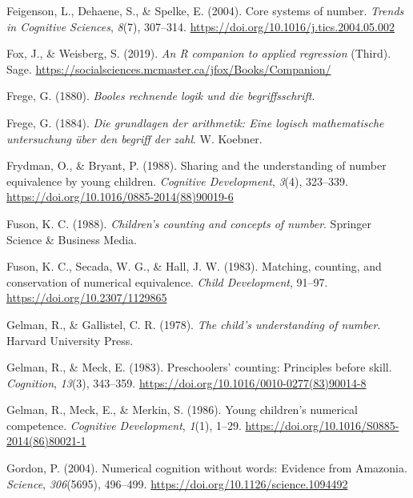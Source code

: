 \documentclass[
  man,floatsintext]{apa7}
\newlength{\cslhangindent}
\newlength{\cslentryspacingunit} %
\newenvironment{CSLReferences}[2] %
 {%
  \setlength{\parindent}{0pt}
  \ifodd #1
  \let\oldpar\par
  \def\par{\hangindent=\cslhangindent\oldpar}
  \fi
  \setlength{\parskip}{#2\cslentryspacingunit}
 }%
 {}
\begin{document}
\begin{CSLReferences}{1}{0}
\leavevmode{}%
Feigenson, L., Dehaene, S., \& Spelke, E. (2004). Core systems of number. \emph{Trends in Cognitive Sciences}, \emph{8}(7), 307--314. \url{https://doi.org/10.1016/j.tics.2004.05.002}

\leavevmode{}%
Fox, J., \& Weisberg, S. (2019). \emph{An {R} companion to applied regression} (Third). Sage. \url{https://socialsciences.mcmaster.ca/jfox/Books/Companion/}

\leavevmode{}%
Frege, G. (1880). \emph{Booles rechnende logik und die begriffsschrift}.

\leavevmode{}%
Frege, G. (1884). \emph{Die grundlagen der arithmetik: Eine logisch mathematische untersuchung über den begriff der zahl}. W. Koebner.

\leavevmode{}%
Frydman, O., \& Bryant, P. (1988). Sharing and the understanding of number equivalence by young children. \emph{Cognitive Development}, \emph{3}(4), 323--339. \url{https://doi.org/10.1016/0885-2014(88)90019-6}

\leavevmode{}%
Fuson, K. C. (1988). \emph{Children's counting and concepts of number}. Springer Science \& Business Media.

\leavevmode{}%
Fuson, K. C., Secada, W. G., \& Hall, J. W. (1983). Matching, counting, and conservation of numerical equivalence. \emph{Child Development}, 91--97. \url{https://doi.org/10.2307/1129865}

\leavevmode{}%
Gelman, R., \& Gallistel, C. R. (1978). \emph{The child's understanding of number}. Harvard University Press.

\leavevmode{}%
Gelman, R., \& Meck, E. (1983). Preschoolers' counting: Principles before skill. \emph{Cognition}, \emph{13}(3), 343--359. \url{https://doi.org/10.1016/0010-0277(83)90014-8}

\leavevmode{}%
Gelman, R., Meck, E., \& Merkin, S. (1986). Young children's numerical competence. \emph{Cognitive Development}, \emph{1}(1), 1--29. \url{https://doi.org/10.1016/S0885-2014(86)80021-1}

\leavevmode{}%
Gordon, P. (2004). Numerical cognition without words: Evidence from {Amazonia}. \emph{Science}, \emph{306}(5695), 496--499. \url{https://doi.org/10.1126/science.1094492}


\end{CSLReferences}
\end{document}
